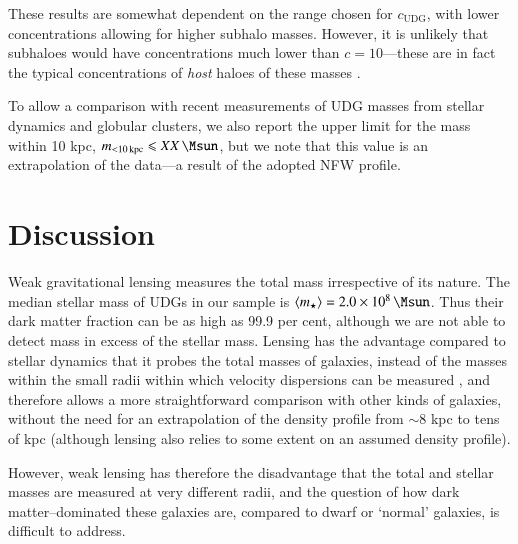 \documentclass[usenatbib,fleqn]{mnras}
\def\udg{\mathrm{UDG}}
\def\percent{ per cent}
\begin{document}
These results are somewhat dependent on the range chosen for $c_\udg$, with lower concentrations allowing for higher subhalo masses. However, it is unlikely that subhaloes would have concentrations much lower than $c=10$---these are in fact the typical concentrations of \emph{host} haloes of these masses \citep[e.g.,][]{dutton14,moline16}.

To allow a comparison with recent measurements of UDG masses from stellar dynamics and globular clusters, we also report the upper limit for the mass within 10 kpc, $m_\mathrm{<10\,kpc}\leq XX\,\Msun$, but we note that this value is an extrapolation of the data---a result of the adopted NFW profile.


\section{Discussion}
\label{s:discussion}
 
Weak gravitational lensing measures the total mass irrespective of its nature. The median stellar mass of UDGs in our sample is $\langle m_\star \rangle = 2.0\times10^8\,\Msun$. Thus their dark matter fraction can be as high as 99.9\percent, although we are not able to detect mass in excess of the stellar mass. Lensing has the advantage compared to stellar dynamics that it probes the total masses of galaxies, instead of the masses within the small radii within which velocity dispersions can be measured \citep[e.g., roughly 8 kpc in the case of DF17 in the Coma cluster][]{beasley16_acs,peng16}, and therefore allows a more straightforward comparison with other kinds of galaxies, without the need for an extrapolation of the density profile from $\sim8$ kpc to tens of kpc (although lensing also relies to some extent on an assumed density profile).

However, weak lensing has therefore the disadvantage that the total and stellar masses are measured at very different radii, and the question of how dark matter--dominated these galaxies are, compared to dwarf or `normal' galaxies, is difficult to address.
\end{document}
